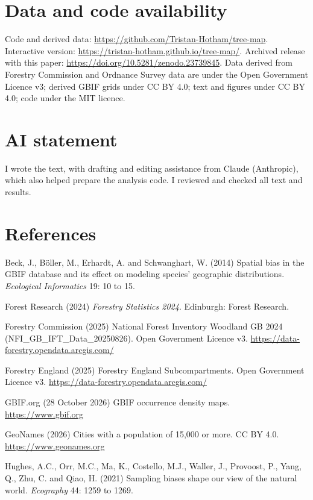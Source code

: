 \documentclass[11pt,a4paper]{article}
\begin{document}
\section*{Data and code availability}

Code and derived data: \url{https://github.com/Tristan-Hotham/tree-map}. Interactive version: \url{https://tristan-hotham.github.io/tree-map/}. Archived release with this paper: \url{https://doi.org/10.5281/zenodo.23739845}. Data derived from Forestry Commission and Ordnance Survey data are under the Open Government Licence v3; derived GBIF grids under CC BY 4.0; text and figures under CC BY 4.0; code under the MIT licence.

\section*{AI statement}

I wrote the text, with drafting and editing assistance from Claude (Anthropic), which also helped prepare the analysis code. I reviewed and checked all text and results.

\section*{References}
\small
\setlength{\parskip}{0.3em}

Beck, J., B\"oller, M., Erhardt, A. and Schwanghart, W. (2014) Spatial bias in the GBIF database and its effect on modeling species' geographic distributions. \textit{Ecological Informatics} 19: 10 to 15.

Forest Research (2024) \textit{Forestry Statistics 2024}. Edinburgh: Forest Research.

Forestry Commission (2025) National Forest Inventory Woodland GB 2024 (NFI\_GB\_IFT\_Data\_20250826). Open Government Licence v3. \url{https://data-forestry.opendata.arcgis.com/}

Forestry England (2025) Forestry England Subcompartments. Open Government Licence v3. \url{https://data-forestry.opendata.arcgis.com/}

GBIF.org (28 October 2026) GBIF occurrence density maps. \url{https://www.gbif.org}

GeoNames (2026) Cities with a population of 15,000 or more. CC BY 4.0. \url{https://www.geonames.org}

Hughes, A.C., Orr, M.C., Ma, K., Costello, M.J., Waller, J., Provoost, P., Yang, Q., Zhu, C. and Qiao, H. (2021) Sampling biases shape our view of the natural world. \textit{Ecography} 44: 1259 to 1269.
\end{document}
